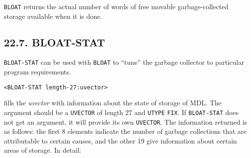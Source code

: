 \documentclass[a4paper,]{article}
\begin{document}
\texttt{BLOAT} returns the actual number of words of free movable garbage-collected storage available when it is done.

\subsection{22.7. BLOAT-STAT}\label{bloat-stat}

\texttt{BLOAT-STAT} can be used with \texttt{BLOAT} to ``tune'' the garbage collector to
particular program requirements.

\begin{verbatim}
<BLOAT-STAT length-27:uvector>
\end{verbatim}

fills the \emph{uvector} with information about the state of storage of MDL. The argument should be a \texttt{UVECTOR} of
length 27 and \texttt{UTYPE} \texttt{FIX}. If \texttt{BLOAT-STAT} does not get an argument, it will provide its own
\texttt{UVECTOR}. The information returned is as follows: the first 8 elements indicate the number of garbage collections
that are attributable to certain causes, and the other 19 give information about certain areas of storage. In detail:
\end{document}
